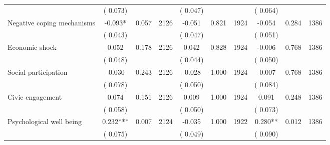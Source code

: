 \begin{tabular}{l*{9}{c}}
                               &        (       0.073) & &                                                                &       (       0.047) & &                                                         &       (       0.064) & & \\ 
 Negative coping mechanisms                &             -0.093*        &        0.057 & 2126        &             -0.051 &        0.821 & 1924               &       -0.054 &        0.284 & 1386       \\ 
                               &        (       0.043) & &                                                                &       (       0.047) & &                                                         &       (       0.051) & & \\ 
 Economic shock                &              0.052        &        0.178 & 2126        &              0.042 &        0.828 & 1924               &       -0.006 &        0.768 & 1386       \\ 
                               &        (       0.048) & &                                                                &       (       0.044) & &                                                         &       (       0.050) & & \\ 
 Social participation                &             -0.030        &        0.243 & 2126        &             -0.028 &        1.000 & 1924               &       -0.007 &        0.768 & 1386      \\ 
                               &        (       0.078) & &                                                                &       (       0.050) & &                                                         &       (       0.084) & & \\ 
 Civic engagement                &              0.074        &        0.151 & 2126        &              0.009 &        1.000 & 1924               &        0.091 &        0.248 & 1386       \\ 
                               &        (       0.058) & &                                                                &       (       0.050) & &                                                         &       (       0.073) & & \\ 
 Psychological well being                &              0.232***        &        0.007 & 2124        &             -0.035 &        1.000 & 1922               &        0.280** &        0.012 & 1386       \\ 
                               &        (       0.075) & &                                                                &       (       0.049) & &                                                         &       (       0.090) & & \\ 

\end{tabular}
